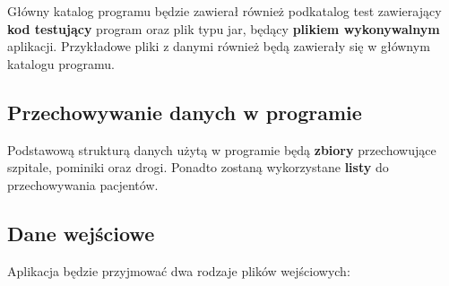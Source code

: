\documentclass{article}
\begin{document}
    Główny katalog programu będzie zawierał również podkatalog test zawierający \textbf{kod testujący} program oraz plik typu jar, będący \textbf{plikiem wykonywalnym} aplikacji. Przykładowe pliki z danymi również będą zawierały się w głównym katalogu programu.

    \subsection{Przechowywanie danych w programie}
    Podstawową strukturą danych użytą w programie będą \textbf{zbiory} przechowujące szpitale, pominiki oraz drogi. Ponadto zostaną wykorzystane \textbf{listy} do przechowywania pacjentów.

    \subsection{Dane wejściowe}
    Aplikacja będzie przyjmować dwa rodzaje plików wejściowych:
\end{document}
